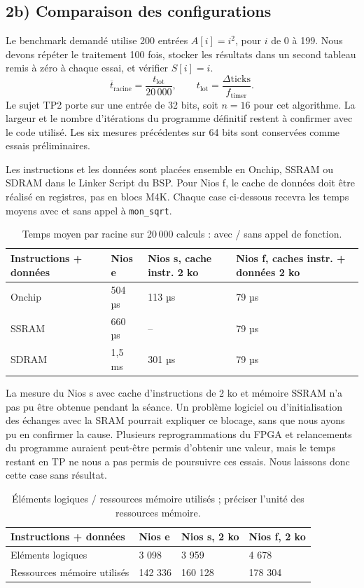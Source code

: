 \documentclass[a4paper,11pt]{article}
\begin{document}
\clearpage
\subsection*{2b) Comparaison des configurations}
Le benchmark demandé utilise 200 entrées $A[i]=i^2$, pour $i$ de 0 à 199. Nous devons répéter le traitement 100 fois, stocker les résultats dans un second tableau remis à zéro à chaque essai, et vérifier $S[i]=i$.
\[
\overline{t}_{\mathrm{racine}}=\frac{t_{\mathrm{lot}}}{20\,000},\qquad
 t_{\mathrm{lot}}=\frac{\Delta\mathrm{ticks}}{f_{\mathrm{timer}}}.
\]
Le sujet TP2 porte sur une entrée de 32 bits, soit $n=16$ pour cet algorithme. La largeur et le nombre d’itérations du programme définitif restent à confirmer avec le code utilisé. Les six mesures précédentes sur 64 bits sont conservées comme essais préliminaires.

Les instructions et les données sont placées ensemble en Onchip, SSRAM ou SDRAM dans le Linker Script du BSP. Pour Nios f, le cache de données doit être réalisé en registres, pas en blocs M4K. Chaque case ci-dessous recevra les temps moyens avec et sans appel à \texttt{mon\_sqrt}.
\begin{table}[H]
\centering
\small
\begin{tabularx}{\linewidth}{@{}lXXX@{}}
\toprule
Instructions + données & Nios e & Nios s, cache instr. 2 ko & Nios f, caches instr. + données 2 ko\\
\midrule
Onchip & 504 µs & 113 µs & 79 µs\\
SSRAM & 660 µs & -- & 79 µs\\
SDRAM & 1,5 ms & 301 µs & 79 µs\\
\bottomrule
\end{tabularx}
\caption{Temps moyen par racine sur 20\,000 calculs : avec / sans appel de fonction.}
\end{table}

La mesure du Nios s avec cache d’instructions de 2 ko et mémoire SSRAM n’a pas pu être obtenue pendant la séance. Un problème logiciel ou d’initialisation des échanges avec la SRAM pourrait expliquer ce blocage, sans que nous ayons pu en confirmer la cause. Plusieurs reprogrammations du FPGA et relancements du programme auraient peut-être permis d’obtenir une valeur, mais le temps restant en TP ne nous a pas permis de poursuivre ces essais. Nous laissons donc cette case sans résultat.

\begin{table}[H]
\centering
\small
\begin{tabularx}{\linewidth}{@{}lXXX@{}}
\toprule
Instructions + données & Nios e & Nios s, 2 ko & Nios f, 2 ko\\
\midrule
Eléments logiques & 3 098 & 3 959 & 4 678\\
Ressources mémoire utilisés & 142 336 & 160 128 & 178 304\\
\bottomrule
\end{tabularx}
\caption{Éléments logiques / ressources mémoire utilisés ; préciser l’unité des ressources mémoire.}
\end{table}
\end{document}
